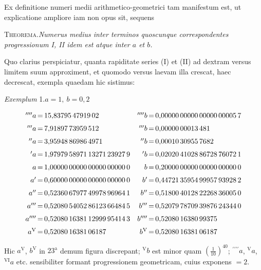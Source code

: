 \par 
Ex definitione numeri medii arithmetico-geometrici tam manifestum est, ut
explicatione ampliore iam non opus sit, sequens

\textsc{Theorema.}\quad \textit{Numerus medius inter terminos quoscunque correspondentes progressionum I, II idem est atque inter $a$ et $b$.}


Quo clarius perspiciatur, quanta rapiditate series (I) et (II) ad dextram
versus limitem suum approximent, et quomodo versus laevam illa crescat, haec
decrescat, exempla quaedam hic sistimus:

\begin{center}\textit{Exemplum} 1.\quad $a=1,\ b=0{,}2$\end{center}
\begingroup\small\setlength{\arraycolsep}{0pt}
\[\begin{array}{r@{\,=\,}l@{\quad}r@{\,=\,}l}
{}^{\prime\prime\prime\prime}a&15{,}83795\,47919\,02&{}^{\prime\prime\prime\prime}b&0{,}00000\,00000\,00000\,00005\,7\\[6pt]
{}^{\prime\prime\prime}a&7{,}91897\,73959\,512&{}^{\prime\prime\prime}b&0{,}00000\,00013\,481\\[6pt]
{}^{\prime\prime}a&3{,}95948\,86986\,4971&{}^{\prime\prime}b&0{,}00010\,30955\,7682\\[6pt]
{}^{\prime}a&1{,}97979\,58971\,13271\,23927\,9&{}^{\prime}b&0{,}02020\,41028\,86728\,76072\,1\\[6pt]
a&1{,}00000\,00000\,00000\,00000\,0&b&0{,}20000\,00000\,00000\,00000\,0\\[6pt]
a'&0{,}60000\,00000\,00000\,00000\,0&b'&0{,}44721\,35954\,99957\,93928\,2\\[6pt]
a''&0{,}52360\,67977\,49978\,96964\,1&b''&0{,}51800\,40128\,22268\,36005\,0\\[6pt]
a'''&0{,}52080\,54052\,86123\,66484\,5&b'''&0{,}52079\,78709\,39876\,24344\,0\\[6pt]
a''''&0{,}52080\,16381\,12999\,95414\,3&b''''&0{,}52080\,16380\,99375\\[6pt]
a^{\mathrm V}&0{,}52080\,16381\,06187&b^{\mathrm V}&0{,}52080\,16381\,06187
\end{array}
\]\endgroup

Hic $a^{\mathrm V}$, $b^{\mathrm V}$ in $23^{\mathrm a}$ demum figura discrepant;
${}^{\mathrm V}b$ est minor quam $(\frac{1}{10})^{40}$;
${}^{\prime\prime\prime\prime}a$, ${}^{\mathrm V}a$, ${}^{\mathrm{VI}}a$ etc.
sensibiliter formant progressionem geometricam, cuius exponens $=2$.

